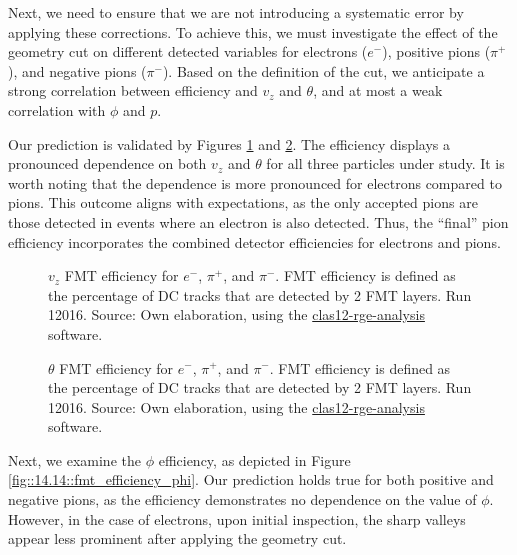     Next, we need to ensure that we are not introducing a systematic error by applying these corrections.
    To achieve this, we must investigate the effect of the geometry cut on different detected variables for electrons ($e^-$), positive pions ($\pi^+$), and negative pions ($\pi^-$).
    Based on the definition of the cut, we anticipate a strong correlation between efficiency and $v_z$ and $\theta$, and at most a weak correlation with $\phi$ and $p$.

    Our prediction is validated by Figures \ref{fig::14.14::fmt_efficiency_vz} and \ref{fig::14.14::fmt_efficiency_theta}.
    The efficiency displays a pronounced dependence on both $v_z$ and $\theta$ for all three particles under study.
    It is worth noting that the dependence is more pronounced for electrons compared to pions.
    This outcome aligns with expectations, as the only accepted pions are those detected in events where an electron is also detected.
    Thus, the ``final'' pion efficiency incorporates the combined detector efficiencies for electrons and pions.

    \begin{figure}[t!]
        \centering{}
        \caption[$v_z$ FMT efficiency for $e^-$, $\pi^+$, and $\pi^-$.
        Run 12016]{$v_z$ FMT efficiency for $e^-$, $\pi^+$, and $\pi^-$.
        FMT efficiency is defined as the percentage of DC tracks that are detected by 2 FMT layers.
        Run 12016.
        Source: Own elaboration, using the \hyperlink{github.com/bleaktwig/clas12-rge-analysis}{clas12-rge-analysis} software.}
        \label{fig::14.14::fmt_efficiency_vz}
    \end{figure}

    \begin{figure}[t!]
        \centering{}
        \caption[$\theta$ FMT efficiency for $e^-$, $\pi^+$, and $\pi^-$.
        Run 12016]{$\theta$ FMT efficiency for $e^-$, $\pi^+$, and $\pi^-$.
        FMT efficiency is defined as the percentage of DC tracks that are detected by 2 FMT layers.
        Run 12016.
        Source: Own elaboration, using the \hyperlink{github.com/bleaktwig/clas12-rge-analysis}{clas12-rge-analysis} software.}
        \label{fig::14.14::fmt_efficiency_theta}
    \end{figure}

    Next, we examine the $\phi$ efficiency, as depicted in Figure \ref{fig::14.14::fmt_efficiency_phi}.
    Our prediction holds true for both positive and negative pions, as the efficiency demonstrates no dependence on the value of $\phi$.
    However, in the case of electrons, upon initial inspection, the sharp valleys appear less prominent after applying the geometry cut.

